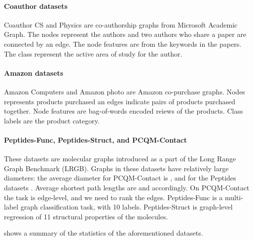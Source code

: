 \documentclass{article}
\theoremstyle{plain}
\theoremstyle{definition}
\theoremstyle{remark}
\begin{document}
\paragraph{Coauthor datasets} 
Coauthor CS and Physics are co-authorship graphs from Microsoft Academic Graph.  The nodes represent the authors
and two authors who share a paper are connected by an edge.  The node features are from the keywords in the papers.
The class represent the active area of study for the author.

\paragraph{Amazon datasets}
Amazon Computers and Amazon photo are Amazon co-purchase graphs. Nodes represents products purchased an edges indicate
pairs of products purchased together.  Node features are bag-of-words encoded reiews of the products. Class labels are the product category.

\paragraph{Peptides-Func, Peptides-Struct, and PCQM-Contact} \citep{dwivedi2021graph} These datasets are molecular graphs introduced as a part of the Long Range Graph Benchmark (LRGB). Graphs in these datasets have relatively large diameters: the average diameter for PCQM-Contact is , and for the Peptides datasets . Average shortest path lengths are  and   accordingly. On PCQM-Contact the task is edge-level, and we need to rank the edges. Peptides-Func is a multi-label graph classification task, with 10 labels. Peptides-Struct is graph-level regression of 11 structural properties of the molecules.

 shows a summary of the statistics of the
aforementioned datasets.
\end{document}
